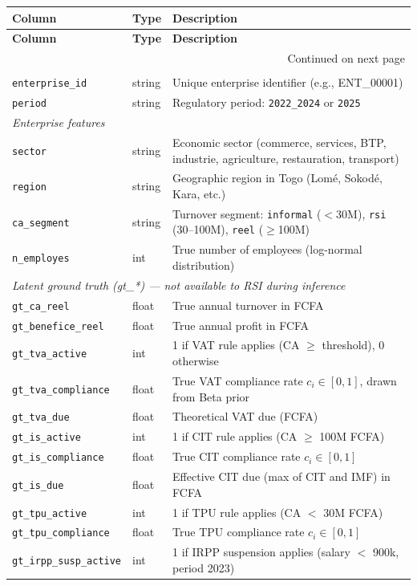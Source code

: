 \begin{longtable}{lp{2.2cm}p{6cm}}
\toprule
\textbf{Column} & \textbf{Type} & \textbf{Description} \\
\midrule
\endfirsthead
\toprule
\textbf{Column} & \textbf{Type} & \textbf{Description} \\
\midrule
\endhead
\midrule
\multicolumn{3}{r}{\small Continued on next page} \\
\endfoot
\bottomrule
\endlastfoot

\multicolumn{3}{l}{\textit{Identifiers}} \\[2pt]
\texttt{enterprise\_id} & string & Unique enterprise identifier (e.g., ENT\_00001) \\
\texttt{period} & string & Regulatory period: \texttt{2022\_2024} or \texttt{2025} \\[6pt]

\multicolumn{3}{l}{\textit{Enterprise features}} \\[2pt]
\texttt{sector} & string & Economic sector (commerce, services, BTP, industrie, agriculture, restauration, transport) \\
\texttt{region} & string & Geographic region in Togo (Lomé, Sokodé, Kara, etc.) \\
\texttt{ca\_segment} & string & Turnover segment: \texttt{informal} ($<$30M), \texttt{rsi} (30--100M), \texttt{reel} ($\geq$100M) \\
\texttt{n\_employes} & int & True number of employees (log-normal distribution) \\[6pt]

\multicolumn{3}{l}{\textit{Latent ground truth (gt\_*) --- not available to RSI during inference}} \\[2pt]
\texttt{gt\_ca\_reel} & float & True annual turnover in FCFA \\
\texttt{gt\_benefice\_reel} & float & True annual profit in FCFA \\
\texttt{gt\_tva\_active} & int & 1 if VAT rule applies (CA $\geq$ threshold), 0 otherwise \\
\texttt{gt\_tva\_compliance} & float & True VAT compliance rate $c_i \in [0,1]$, drawn from Beta prior \\
\texttt{gt\_tva\_due} & float & Theoretical VAT due (FCFA) \\
\texttt{gt\_is\_active} & int & 1 if CIT rule applies (CA $\geq$ 100M FCFA) \\
\texttt{gt\_is\_compliance} & float & True CIT compliance rate $c_i \in [0,1]$ \\
\texttt{gt\_is\_due} & float & Effective CIT due (max of CIT and IMF) in FCFA \\
\texttt{gt\_tpu\_active} & int & 1 if TPU rule applies (CA $<$ 30M FCFA) \\
\texttt{gt\_tpu\_compliance} & float & True TPU compliance rate $c_i \in [0,1]$ \\
\texttt{gt\_irpp\_susp\_active} & int & 1 if IRPP suspension applies (salary $<$ 900k, period 2023) \\[6pt]


\end{longtable}
